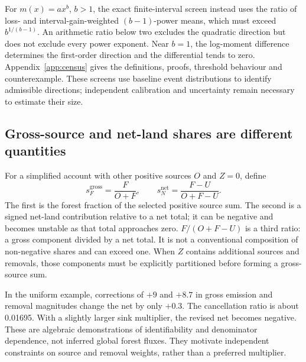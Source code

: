 \documentclass[11pt,a4paper]{article}
\theoremstyle{remark}
\begin{document}
For $m(x)=ax^b$, $b>1$, the exact finite-interval screen instead uses the ratio of loss- and interval-gain-weighted $(b-1)$-power means, which must exceed $b^{1/(b-1)}$. An arithmetic ratio below two excludes the quadratic direction but does not exclude every power exponent. Near $b=1$, the log-moment difference determines the first-order direction and the differential tends to zero. Appendix~\ref{app:census} gives the definitions, proofs, threshold behaviour and counterexample. These screens use baseline event distributions to identify admissible directions; independent calibration and uncertainty remain necessary to estimate their size.

\subsection{Gross-source and net-land shares are different quantities}
For a simplified account with other positive sources $O$ and $Z=0$, define
\begin{equation}
s_F^{\mathrm{gross}}=\frac{F}{O+F},\qquad
s_N^{\mathrm{net}}=\frac{F-U}{O+F-U}.
\label{eq:shares}
\end{equation}
The first is the forest fraction of the selected positive source sum. The second is a signed net-land contribution relative to a net total; it can be negative and becomes unstable as that total approaches zero. $F/(O+F-U)$ is a third ratio: a gross component divided by a net total. It is not a conventional composition of non-negative shares and can exceed one. When $Z$ contains additional sources and removals, those components must be explicitly partitioned before forming a gross-source sum.

\begin{table}[htbp]
\centering\small
\caption{Synthetic paired-correction example: $F=6$, $U=5.8$, $O=50$, $Z=0$. Flow units are arbitrary common annual mass units, not 2025 observations. The last two columns follow \eqref{eq:shares}; percentages have different denominators.}
\label{tab:paired}
\end{table}

In the uniform example, corrections of $+9$ and $+8.7$ in gross emission and removal magnitudes change the net by only $+0.3$. The cancellation ratio is about 0.01695. With a slightly larger sink multiplier, the revised net becomes negative. These are algebraic demonstrations of identifiability and denominator dependence, not inferred global forest fluxes. They motivate independent constraints on source and removal weights, rather than a preferred multiplier.
\end{document}

